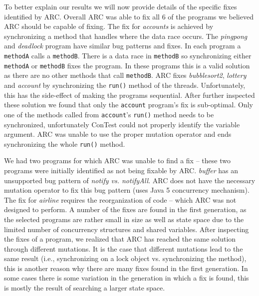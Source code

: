 
To better explain our results we will now provide details of the specific fixes identified by ARC. Overall ARC was able to fix all 6 of the programs we believed ARC should be capable of fixing. The fix for \textit{accounts} is achieved by synchronizing a method that handles where the data race occurs.  The \textit{pingpong} and
\textit{deadlock} program have similar bug patterns and fixes.  In each program
a \texttt{methodA} calls a \texttt{methodB}.  There is a data race in
\texttt{methodB} so synchronizing either \texttt{methodA} or \texttt{methodB}
fixes the program.  In these programs this is a valid solution as there are no
other methods that call \texttt{methodB}.  ARC fixes \textit{bubblesort2}, \textit{lottery} and \textit{account} by synchronizing the \texttt{run()} method of the threads.  Unfortunately, this has the side-effect of making the
programs sequential.  After further inspected these solution we found that only the \texttt{account} program's fix is sub-optimal.  Only one of the
methods called from \texttt{account}'s  \texttt{run()} method  needs to be
synchronized, unfortunately ConTest could not properly identify the variable
argument. ARC was unable to use the proper mutation operator and ends synchronizing the whole \texttt{run()} method.

We had two programs for which ARC was unable to find a fix -- these two programs were initially identified as not being fixable by ARC. \textit{buffer} has an unsupported bug pattern of
\textit{notify vs. notifyAll}. ARC does not have the necessary mutation
operator to fix this bug pattern (uses Java 5 concurrency mechanism). The fix
for \textit{airline} requires the reorganization of code -- which ARC was not
designed to perform.  A number of the fixes are found in the first generation,
as the selected programs are rather small in size as well as state space due to
the limited number of concurrency structures and shared variables.  After
inspecting the fixes of a program, we realized that ARC has reached the same
solution through different mutations. It is the case that different mutations
lead to the same result (i.e., synchronizing on a lock object vs. synchronizing
the method), this is another reason why there are many fixes found in the first
generation.  In  some cases there is some variation in the generation in which a
fix is found, this is mostly the result of searching a larger state space.

